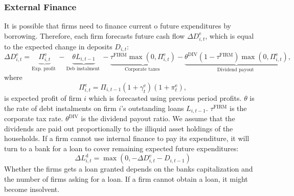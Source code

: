 \subsubsection{External Finance}
It is possible that firms need to finance current o future expenditures by borrowing.  Therefore, each firm forecasts future cash flow $\Delta D_{i,t}^{\mathrm{e}}$, which is equal to the expected change in deposits $D_{i,t}$:
\begin{equation}
    \Delta D_{i,t}^{\mathrm{e}} =\underbrace{\Pi_{i,t}^{\mathrm{e}} }_{\text {Exp. profit }}-\underbrace{\theta L_{i,t-1} }_{\text {Deb instalment }}-\underbrace{\tau^{\mathrm{FIRM}} \max \left(0, \Pi_{i,t}^{\mathrm{e}} \right)}_{\text {Corporate taxes }}-\underbrace{\theta^{\mathrm{DIV}}\left(1-\tau^{\mathrm{FIRM}}\right) \max \left(0, \Pi_{i,t}^{\mathrm{e}} \right)}_{\text {Dividend payout }},
\end{equation}
where
\begin{equation}
    \Pi_{i,t}^{\mathrm{e}} =\Pi_{i,t-1} \left(1+\gamma_t^{\mathrm{e}} \right)\left(1+\pi_t^{\mathrm{e}} \right),
\end{equation}
is expected profit of firm $i$ which is forecasted using previous period profits. $\theta$ is the rate of debt instalments on  firm $i$'s outstanding loans $L_{i,t-1}$. $\tau^{\mathrm{FIRM}}$ is the corporate tax rate. $\theta^{\mathrm{DIV}}$ is the dividend payout ratio. We assume that the dividends are paid out proportionally to the illiquid asset holdings of the households. If a firm cannot use internal finance to pay its expenditure, it will turn to a bank for a loan to cover remaining expected future expenditures:
\begin{equation}
\Delta L_{i,t}^{\mathrm{d}}=\max \left(0,-\Delta D_{i,t}^{\mathrm{e}}-D_{i,t-1}\right)
\end{equation}
Whether the firms gets a loan granted depends on the banks capitalization and the number of firms asking for a loan. If a firm cannot obtain a loan, it might become insolvent.
